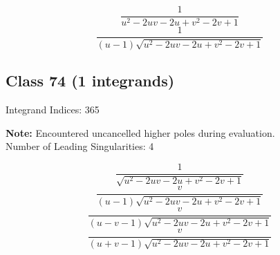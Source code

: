 \documentclass[11pt,a4paper]{article}
\begin{document}
\begin{equation}
\frac{1}{u^2-2 u v-2 u+v^2-2 v+1}
\end{equation}
\begin{equation}
\frac{1}{(u-1) \sqrt{u^2-2 u v-2 u+v^2-2 v+1}}
\end{equation}


\subsection*{Class 74 (1 integrands)}
Integrand Indices: 365

\textbf{Note:} Encountered uncancelled higher poles during evaluation.\\[1em]

Number of Leading Singularities: 4

\begin{equation}
\frac{1}{\sqrt{u^2-2 u v-2 u+v^2-2 v+1}}
\end{equation}
\begin{equation}
\frac{v}{(u-1) \sqrt{u^2-2 u v-2 u+v^2-2 v+1}}
\end{equation}
\begin{equation}
\frac{v}{(u-v-1) \sqrt{u^2-2 u v-2 u+v^2-2 v+1}}
\end{equation}
\begin{equation}
\frac{v}{(u+v-1) \sqrt{u^2-2 u v-2 u+v^2-2 v+1}}
\end{equation}
\end{document}

